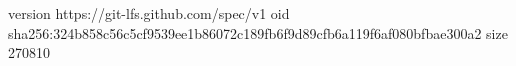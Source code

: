 version https://git-lfs.github.com/spec/v1
oid sha256:324b858c56c5cf9539ee1b86072c189fb6f9d89cfb6a119f6af080bfbae300a2
size 270810
